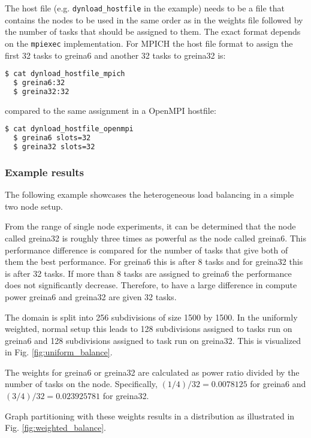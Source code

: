 The host file (e.g. \texttt{dynload\_hostfile} in the example) needs to be a file that contains the nodes to be used in the same order as in the weights file followed by the number of tasks that should be assigned to them.
The exact format depends on the \texttt{mpiexec} implementation.
For MPICH the host file format to assign the first 32 tasks to greina6 and another 32 tasks to greina32 is:

\begin{lstlisting}[language=bash]
  $ cat dynload_hostfile_mpich
  $ greina6:32
  $ greina32:32
\end{lstlisting}

compared to the same assignment in a OpenMPI hostfile:

\begin{lstlisting}[language=bash]
  $ cat dynload_hostfile_openmpi
  $ greina6 slots=32
  $ greina32 slots=32
\end{lstlisting}


\subsubsection{Example results}
The following example showcases the heterogeneous load balancing in a simple two node setup.

From the range of single node experiments, it can be determined that the node called greina32 is roughly three times as powerful as the node called greina6.
This performance difference is compared for the number of tasks that give both of them the best performance.
For greina6 this is after 8 tasks and for greina32 this is after 32 tasks.
If more than 8 tasks are assigned to greina6 the performance does not significantly decrease.
Therefore, to have a large difference in compute power greina6 and greina32 are given 32 tasks.

The domain is split into 256 subdivisions of size 1500 by 1500.
In the uniformly weighted, normal setup this leads to 128 subdivisions assigned to tasks run on greina6 and 128 subdivisions assigned to task run on greina32.
This is visualized in Fig. \ref{fig:uniform_balance}.

The weights for greina6 or greina32 are calculated as power ratio divided by the number of tasks on the node. 
Specifically, $ \left(1 / 4\right) / 32 = 0.0078125$ for greina6 and $\left(3 / 4\right) / 32 = 0.023925781$ for greina32.

Graph partitioning with these weights results in a distribution as illustrated in Fig. \ref{fig:weighted_balance}.

